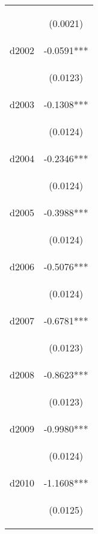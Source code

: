 \begin{center}
\begin{tabular}{lc}
\vspace{4pt} & \begin{footnotesize}(0.0021)\end{footnotesize} \\
d2002 & -0.0591*** \\
\vspace{4pt} & \begin{footnotesize}(0.0123)\end{footnotesize} \\
d2003 & -0.1308*** \\
\vspace{4pt} & \begin{footnotesize}(0.0124)\end{footnotesize} \\
d2004 & -0.2346*** \\
\vspace{4pt} & \begin{footnotesize}(0.0124)\end{footnotesize} \\
d2005 & -0.3988*** \\
\vspace{4pt} & \begin{footnotesize}(0.0124)\end{footnotesize} \\
d2006 & -0.5076*** \\
\vspace{4pt} & \begin{footnotesize}(0.0124)\end{footnotesize} \\
d2007 & -0.6781*** \\
\vspace{4pt} & \begin{footnotesize}(0.0123)\end{footnotesize} \\
d2008 & -0.8623*** \\
\vspace{4pt} & \begin{footnotesize}(0.0123)\end{footnotesize} \\
d2009 & -0.9980*** \\
\vspace{4pt} & \begin{footnotesize}(0.0124)\end{footnotesize} \\
d2010 & -1.1608*** \\
\vspace{4pt} & \begin{footnotesize}(0.0125)\end{footnotesize} \\

\end{tabular}
\end{center}
